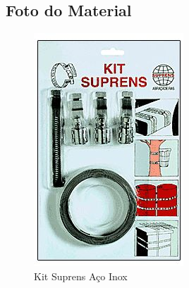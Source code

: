 \subsection{Foto do Material}
\begin{figure}[H]
 \centering
 \includegraphics[width=1\columnwidth]{Abracadeira/foto}
 \caption{Kit Suprens Aço Inox}
  
\end{figure}
\newpage

